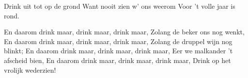 \footnotemark [
ititle={Tsjechisch drinklied}]


\beginverse
{}
{Drink uit tot op de grond}
{Want nooit zien w' ons weerom}
{Voor 't volle jaar is rond.}
\endverse

\beginverse
En daarom drink maar, drink maar, drink maar,
Zolang de beker ons nog wenkt,
En daarom drink maar, drink maar, drink maar,
Zolang de druppel wijn nog blinkt;
En daarom drink maar, drink maar, drink maar,
Eer we malkander 't afscheid bien,
En daarom drink maar, drink maar, drink maar,
Drink op het vrolijk wederzien!
\endverse
\endsong